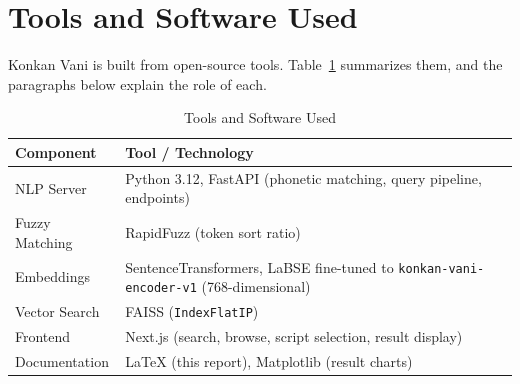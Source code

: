 \documentclass[12pt,a4paper]{article}
\let\oldsection\section
\renewcommand{\section}{\clearpage\oldsection}
\begin{document}
\section{Tools and Software Used}
Konkan Vani is built from open-source tools. Table~\ref{tab:tools} summarizes them, and the paragraphs below explain the role of each.

\begin{table}[H]
\centering
\caption{Tools and Software Used}
\label{tab:tools}
\renewcommand{\arraystretch}{1.3}
\begin{tabularx}{\linewidth}{|l|X|}
\hline
\textbf{Component} & \textbf{Tool / Technology} \\
\hline
NLP Server & Python 3.12, FastAPI (phonetic matching, query pipeline, endpoints) \\
\hline
Fuzzy Matching & RapidFuzz (token sort ratio) \\
\hline
Embeddings & SentenceTransformers, LaBSE fine-tuned to \texttt{konkan-vani-encoder-v1} (768-dimensional) \\
\hline
Vector Search & FAISS (\texttt{IndexFlatIP}) \\
\hline
Frontend & Next.js (search, browse, script selection, result display) \\
\hline
Documentation & \LaTeX{} (this report), Matplotlib (result charts) \\
\hline
\end{tabularx}
\end{table}
\end{document}
